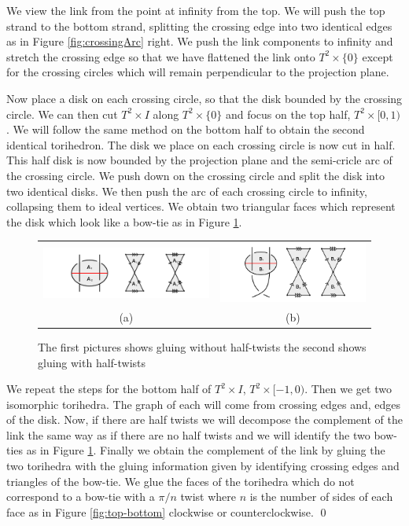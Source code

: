 \documentclass[11pt]{amsart}
\theoremstyle{plain}
\theoremstyle{definition}
\begin{document}
\indent We view the link from the point at infinity from the top. We will push the top strand to the bottom strand, splitting the crossing edge into two identical edges as in Figure \ref{fig:crossingArc} right. We push the link components to infinity and stretch the crossing edge so that we have flattened the link onto $T^2 \times \{0\}$ except for the crossing circles which will remain perpendicular to the projection plane. 
 
\indent Now place a disk on each crossing circle, so that the disk bounded by the crossing circle. We can then cut $T^2 \times I$ along $T^2 \times \{0\}$ and focus on the top half, $T^2 \times [0,1)$. We will follow the same method on the bottom half to obtain the second identical torihedron. The disk we place on each crossing circle is now cut in half. This half disk is now bounded by the projection plane and the semi-cricle arc of the crossing circle. We push down on the crossing circle and split the disk into two identical disks. We then push the arc of each crossing circle to infinity, collapsing them to ideal vertices. We obtain two triangular faces which represent the disk which look like a bow-tie as in Figure \ref{fig:falGluings}. 

\begin{figure}
 \centering
 \begin{tabular}{cc}
 \includegraphics [width=8cm]{falGluing1}&
 \includegraphics [width=7cm]{falGluing2}\\
 (a)&(b)
 \end{tabular}
 \caption{The first pictures shows gluing without half-twists the second shows gluing with half-twists}
 \label{fig:falGluings}
 \end{figure}

\indent We repeat the steps for the bottom half of $T^2 \times I$, $T^2 \times [-1,0)$. Then we get two isomorphic torihedra. The graph of each will come from crossing edges and, edges of the disk. Now, if there are half twists we will decompose the complement of the link the same way as if there are no half twists and we will identify the two bow-ties as in Figure \ref{fig:falGluings}. Finally we obtain the complement of the link by gluing the two torihedra with the gluing information given by identifying crossing edges and triangles of the bow-tie. We glue the faces of the torihedra which do not correspond to a bow-tie with a $\pi/n$ twist where $n$ is the number of sides of each face as in Figure \ref{fig:top-bottom} clockwise or counterclockwise. \qed
\end{document}
